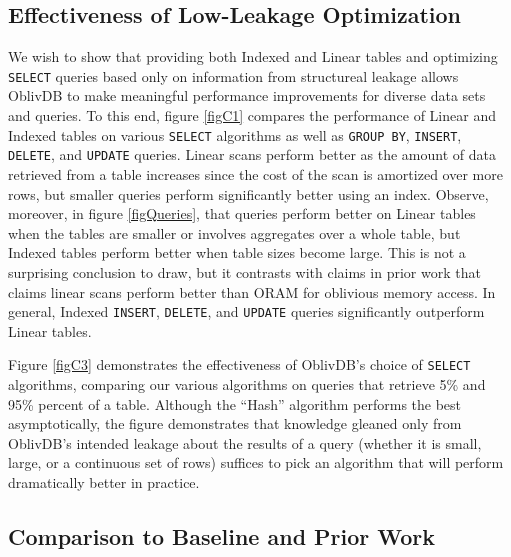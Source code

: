\documentclass[USenglish,oneside,twocolumn]{article}
\def\name/{OblivDB}
\begin{document}

\subsection{Effectiveness of Low-Leakage Optimization}
We wish to show that providing both Indexed and Linear tables and optimizing \texttt{SELECT} queries based only on information from structureal leakage allows \name/ to make meaningful performance improvements for diverse data sets and queries. To this end, figure \ref{figC1} compares the performance of Linear and Indexed tables on various \texttt{SELECT} algorithms as well as \texttt{GROUP BY}, \texttt{INSERT}, \texttt{DELETE}, and \texttt{UPDATE} queries. Linear scans perform better as the amount of data retrieved from a table increases since the cost of the scan is amortized over more rows, but smaller queries perform significantly better using an index. Observe, moreover, in figure \ref{figQueries}, that queries perform better on Linear tables when the tables are smaller or involves aggregates over a whole table, but Indexed tables perform better when table sizes become large. This is not a surprising conclusion to draw, but it contrasts with claims in prior work \cite{RLT15} that claims linear scans perform better than ORAM for oblivious memory access. In general, Indexed \texttt{INSERT}, \texttt{DELETE}, and \texttt{UPDATE} queries significantly outperform Linear tables.

Figure \ref{figC3} demonstrates the effectiveness of \name/'s choice of \texttt{SELECT} algorithms, comparing our various algorithms on queries that retrieve 5\% and 95\% percent of a table. Although the ``Hash'' algorithm performs the best asymptotically, the figure demonstrates that knowledge gleaned only from \name/'s intended leakage about the results of a query (whether it is small, large, or a continuous set of rows) suffices to pick an algorithm that will perform dramatically better in practice. 

\subsection{Comparison to Baseline and Prior Work}
\end{document}
